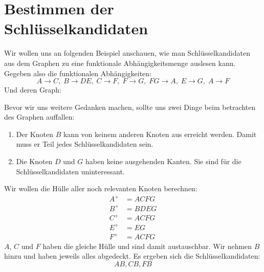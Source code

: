 \documentclass[a4paper, ngerman]{article}
\begin{document}
\section*{Bestimmen der Schlüsselkandidaten}
Wir wollen uns an folgenden Beispiel anschauen,
wie man Schlüsselkandidaten aus dem Graphen zu eine
funktionale Abhängigkeitsmenge auslesen kann.
Gegeben also die funktionalen Abhängigkeiten:
$$
    A  \to C,\;
    B  \to DE,\;
    C  \to F,\;
    F  \to G,\;
    FG \to A,\;
    E  \to G,\;
    A  \to F
$$
Und deren Graph:
\begin{center}
\end{center}
Bevor wir uns weitere Gedanken machen,
sollte uns zwei Dinge beim betrachten des Graphen auffallen:
\begin{enumerate}
    \item Der Knoten $B$ kann von keinem
        anderen Knoten aus erreicht werden.
        Damit muss er Teil jedes Schlüsselkandidaten sein.
    \item Die Knoten $D$ und $G$ haben
        keine ausgehenden Kanten.
        Sie sind für die Schlüsselkandidaten uninteressant.
\end{enumerate}
Wir wollen die Hülle aller noch relevanten Knoten berechnen:
\begin{align*}
    A^+ &= ACFG \\
    B^+ &= BDEG \\
    C^+ &= ACFG \\
    E^+ &= EG \\
    F^+ &= ACFG
\end{align*}
$A$, $C$ und $F$ haben die gleiche Hülle
und sind damit austauschbar.
Wir nehmen $B$ hinzu und haben
jeweils alles abgedeckt.
Es ergeben sich die Schlüsselkandidaten:
$$
    AB, CB, FB
$$
\end{document}
